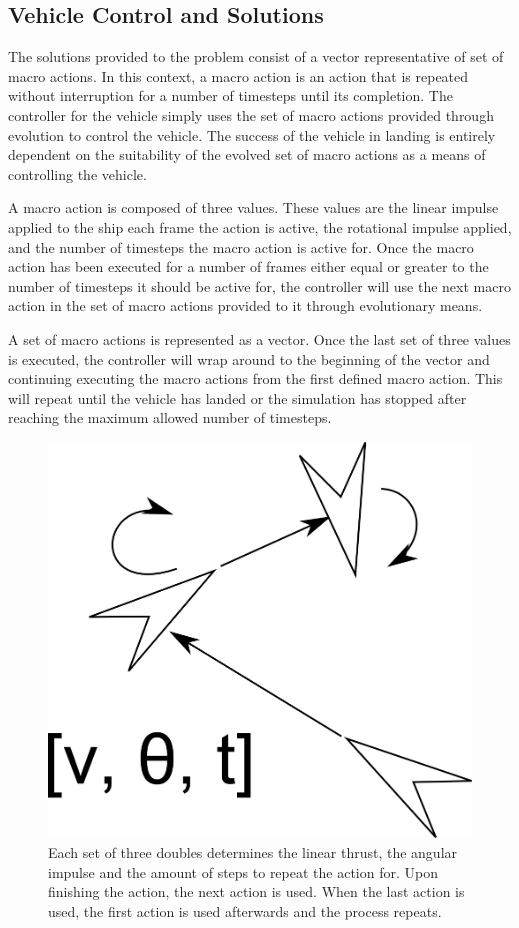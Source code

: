 \documentclass[conference]{IEEEtran}
\begin{document}
\subsection{Vehicle Control and Solutions}

The solutions provided to the problem consist of a vector representative of set of macro actions. In this context, a macro action is an action that is repeated without interruption for a number of timesteps until its completion. The controller for the vehicle simply uses the set of macro actions provided through evolution to control the vehicle. The success of the vehicle in landing is entirely dependent on the suitability of the evolved set of macro actions as a means of controlling the vehicle.

A macro action is composed of three values. These values are the linear impulse applied to the ship each frame the action is active, the rotational impulse applied, and the number of timesteps the macro action is active for. Once the macro action has been executed for a number of frames either equal or greater to the number of timesteps it should be active for, the controller will use the next macro action in the set of macro actions provided to it through evolutionary means.

A set of macro actions is represented as a vector. Once the last set of three values is executed, the controller will wrap around to the beginning of the vector and continuing executing the macro actions from the first defined macro action. This will repeat until the vehicle has landed or the simulation has stopped after reaching the maximum allowed number of timesteps.

\begin{figure}[hbtp]
\centering
\includegraphics[scale=0.5]{img/macroaction}
\caption{Each set of three doubles determines the linear thrust, the angular impulse and the amount of steps to repeat the action for. Upon finishing the action, the next action is used. When the last action is used, the first action is used afterwards and the process repeats.}
\label{fig:graph_macroaction}
\end{figure}
\end{document}
